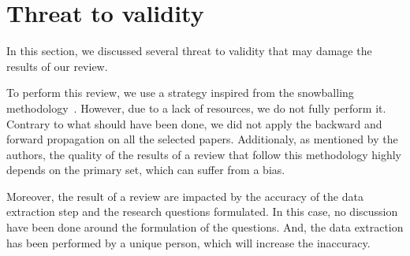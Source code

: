 \section{Threat to validity}
\label{sec:sota:validity}

In this section, we discussed several threat to validity that may damage the results of our review.

To perform this review, we use a strategy inspired from the snowballing methodology~\cite{DBLP:conf/ease/Wohlin14}.
However, due to a lack of resources, we do not fully perform it.
Contrary to what should have been done, we did not apply the backward and forward propagation on all the selected papers.
Additionaly, as mentioned by the authors, the quality of the results of a review that follow this methodology highly depends on the primary set, which can suffer from a bias.

Moreover, the result of a review are impacted by the accuracy of the data extraction step and the research questions formulated.
In this case, no discussion have been done around the formulation of the questions.
And, the data extraction has been performed by a unique person, which will increase the inaccuracy.

